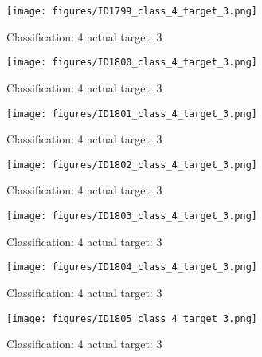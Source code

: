 \begin{figure}[h!]
\begin{center}
\texttt{[image: figures/ID1799\_class\_4\_target\_3.png]}
\end{center}
\caption{ Classification: 4 actual target: 3}
\label{fig:ID1799_class_4_target_3}
\end{figure}
\begin{figure}[h!]
\begin{center}
\texttt{[image: figures/ID1800\_class\_4\_target\_3.png]}
\end{center}
\caption{ Classification: 4 actual target: 3}
\label{fig:ID1800_class_4_target_3}
\end{figure}
\begin{figure}[h!]
\begin{center}
\texttt{[image: figures/ID1801\_class\_4\_target\_3.png]}
\end{center}
\caption{ Classification: 4 actual target: 3}
\label{fig:ID1801_class_4_target_3}
\end{figure}
\begin{figure}[h!]
\begin{center}
\texttt{[image: figures/ID1802\_class\_4\_target\_3.png]}
\end{center}
\caption{ Classification: 4 actual target: 3}
\label{fig:ID1802_class_4_target_3}
\end{figure}
\begin{figure}[h!]
\begin{center}
\texttt{[image: figures/ID1803\_class\_4\_target\_3.png]}
\end{center}
\caption{ Classification: 4 actual target: 3}
\label{fig:ID1803_class_4_target_3}
\end{figure}
\begin{figure}[h!]
\begin{center}
\texttt{[image: figures/ID1804\_class\_4\_target\_3.png]}
\end{center}
\caption{ Classification: 4 actual target: 3}
\label{fig:ID1804_class_4_target_3}
\end{figure}
\begin{figure}[h!]
\begin{center}
\texttt{[image: figures/ID1805\_class\_4\_target\_3.png]}
\end{center}
\caption{ Classification: 4 actual target: 3}
\label{fig:ID1805_class_4_target_3}
\end{figure}
